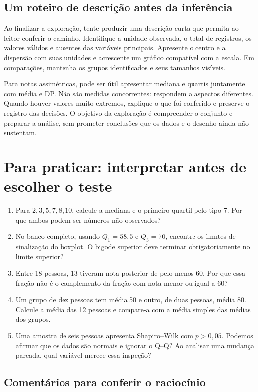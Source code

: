 \subsection{Um roteiro de descrição antes da inferência}

Ao finalizar a exploração, tente produzir uma descrição curta que permita ao leitor conferir o caminho. Identifique a unidade observada, o total de registros, os valores válidos e ausentes das variáveis principais. Apresente o centro e a dispersão com suas unidades e acrescente um gráfico compatível com a escala. Em comparações, mantenha os grupos identificados e seus tamanhos visíveis.

Para notas assimétricas, pode ser útil apresentar mediana e quartis juntamente com média e DP. Não são medidas concorrentes: respondem a aspectos diferentes. Quando houver valores muito extremos, explique o que foi conferido e preserve o registro das decisões. O objetivo da exploração é compreender o conjunto e preparar a análise, sem prometer conclusões que os dados e o desenho ainda não sustentam.

\section{Para praticar: interpretar antes de escolher o teste}

\begin{enumerate}
  \item Para $2,3,5,7,8,10$, calcule a mediana e o primeiro quartil pelo tipo 7. Por que ambos podem ser números não observados?
  \item No banco completo, usando $Q_1=58{,}5$ e $Q_3=70$, encontre os limites de sinalização do boxplot. O bigode superior deve terminar obrigatoriamente no limite superior?
  \item Entre 18 pessoas, 13 tiveram nota posterior de pelo menos 60. Por que essa fração não é o complemento da fração com nota menor ou igual a 60?
  \item Um grupo de dez pessoas tem média 50 e outro, de duas pessoas, média 80. Calcule a média das 12 pessoas e compare-a com a média simples das médias dos grupos.
  \item Uma amostra de seis pessoas apresenta Shapiro--Wilk com $p>0{,}05$. Podemos afirmar que os dados são normais e ignorar o Q--Q? Ao analisar uma mudança pareada, qual variável merece essa inspeção?
\end{enumerate}

\subsection{Comentários para conferir o raciocínio}

